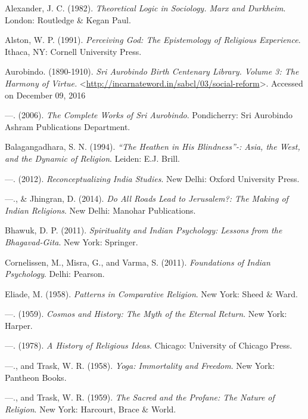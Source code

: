 \begin{thebibliography}{99}
 Alexander, J. C. (1982). \textit{Theoretical Logic in Sociology. Marx and Durkheim}. London: Routledge \& Kegan Paul.

  Alston, W. P. (1991). \textit{Perceiving God: The Epistemology of Religious Experience}. Ithaca, NY: Cornell University Press.

  Aurobindo. (1890-1910). \textit{Sri Aurobindo Birth Centenary Library. Volume 3: The Harmony of Virtue.} \textless \url{http://incarnateword.in/sabcl/03/social-reform}\textgreater . Accessed on December 09, 2016

  —. (2006). \textit{The Complete Works of Sri Aurobindo}. Pondicherry: Sri Aurobindo Ashram Publications Department.

  Balagangadhara, S. N. (1994). \textit{“The Heathen in His Blindness”-: Asia, the West, and the Dynamic of Religion}. Leiden: E.J. Brill.

  —. (2012). \textit{Reconceptualizing India Studies}. New Delhi: Oxford University Press.

  —., \& Jhingran, D. (2014). \textit{Do All Roads Lead to Jerusalem?: The Making of Indian Religions}. New Delhi: Manohar Publications.

  Bhawuk, D. P. (2011). \textit{Spirituality and Indian Psychology: Lessons from the Bhagavad-Gita}. New York: Springer.

  Cornelissen, M., Misra, G., and Varma, S. (2011). \textit{Foundations of Indian Psychology}. Delhi: Pearson.

  Eliade, M. (1958). \textit{Patterns in Comparative Religion}. New York: Sheed \& Ward.

  —. (1959). \textit{Cosmos and History: The Myth of the Eternal Return}. New York: Harper.

  —. (1978). \textit{A History of Religious Ideas}. Chicago: University of Chicago Press.

  —., and Trask, W. R. (1958). \textit{Yoga: Immortality and Freedom}. New York: Pantheon Books.

  —., and Trask, W. R. (1959). \textit{The Sacred and the Profane: The Nature of Religion}. New York: Harcourt, Brace \& World.


\end{thebibliography}
